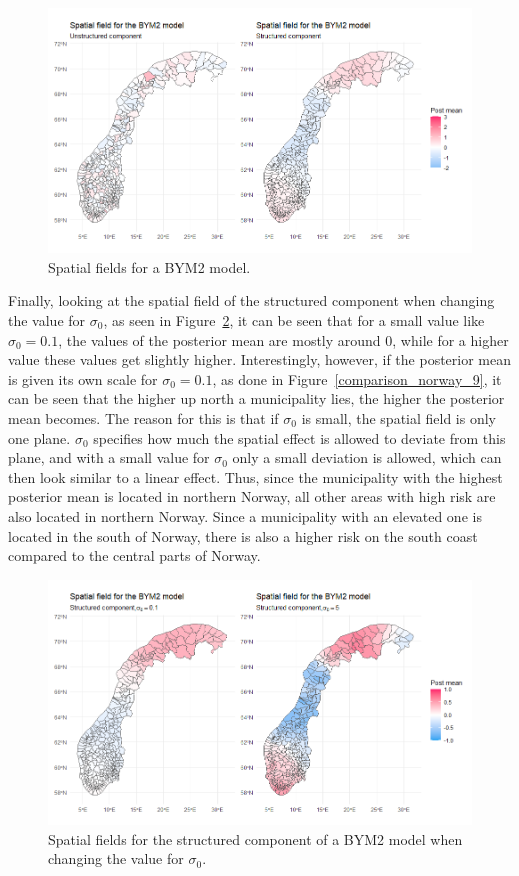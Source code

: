 \begin{figure}[H]
  \centering
  \includegraphics[width = \textwidth]{spatial_field_norway_2.png}
  \caption{Spatial fields for a BYM2 model.}
  \label{comparison_norway_7}
\end{figure}
Finally, looking at the spatial field of the structured component when changing the value for $\sigma_0$, as seen in Figure~\ref{comparison_norway_8}, it can be seen that for a small value like $\sigma_0 = 0.1$, the values of the posterior mean are mostly around 0, while for a higher value these values get slightly higher. Interestingly, however, if the posterior mean is given its own scale for $\sigma_0 = 0.1$, as done in Figure~\ref{comparison_norway_9}, it can be seen that the higher up north a municipality lies, the higher the posterior mean becomes. The reason for this is that if $\sigma_0$ is small, the spatial field is only one plane. $\sigma_0$ specifies how much the spatial effect is allowed to deviate from this plane, and with a small value for $\sigma_0$ only a small deviation is allowed, which can then look similar to a linear effect. Thus, since the municipality with the highest posterior mean is located in northern Norway, all other areas with high risk are also located in northern Norway. Since a municipality with an elevated one is located in the south of Norway, there is also a higher risk on the south coast compared to the central parts of Norway.
\begin{figure}[H]
  \centering
  \includegraphics[width = \textwidth]{spatial_field_norway_3.png}
  \caption{Spatial fields for the structured component of a BYM2 model when changing the value for $\sigma_0$.}
  \label{comparison_norway_8}
\end{figure}
